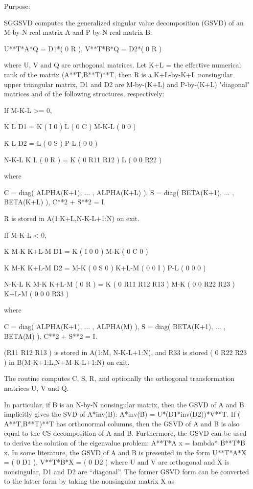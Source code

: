  \begin{DoxyParagraph}{Purpose\+: }
\begin{DoxyVerb} SGGSVD computes the generalized singular value decomposition (GSVD)
 of an M-by-N real matrix A and P-by-N real matrix B:

       U**T*A*Q = D1*( 0 R ),    V**T*B*Q = D2*( 0 R )

 where U, V and Q are orthogonal matrices.
 Let K+L = the effective numerical rank of the matrix (A**T,B**T)**T,
 then R is a K+L-by-K+L nonsingular upper triangular matrix, D1 and
 D2 are M-by-(K+L) and P-by-(K+L) "diagonal" matrices and of the
 following structures, respectively:

 If M-K-L >= 0,

                     K  L
        D1 =     K ( I  0 )
                 L ( 0  C )
             M-K-L ( 0  0 )

                   K  L
        D2 =   L ( 0  S )
             P-L ( 0  0 )

                 N-K-L  K    L
   ( 0 R ) = K (  0   R11  R12 )
             L (  0    0   R22 )

 where

   C = diag( ALPHA(K+1), ... , ALPHA(K+L) ),
   S = diag( BETA(K+1),  ... , BETA(K+L) ),
   C**2 + S**2 = I.

   R is stored in A(1:K+L,N-K-L+1:N) on exit.

 If M-K-L < 0,

                   K M-K K+L-M
        D1 =   K ( I  0    0   )
             M-K ( 0  C    0   )

                     K M-K K+L-M
        D2 =   M-K ( 0  S    0  )
             K+L-M ( 0  0    I  )
               P-L ( 0  0    0  )

                    N-K-L  K   M-K  K+L-M
   ( 0 R ) =     K ( 0    R11  R12  R13  )
               M-K ( 0     0   R22  R23  )
             K+L-M ( 0     0    0   R33  )

 where

   C = diag( ALPHA(K+1), ... , ALPHA(M) ),
   S = diag( BETA(K+1),  ... , BETA(M) ),
   C**2 + S**2 = I.

   (R11 R12 R13 ) is stored in A(1:M, N-K-L+1:N), and R33 is stored
   ( 0  R22 R23 )
   in B(M-K+1:L,N+M-K-L+1:N) on exit.

 The routine computes C, S, R, and optionally the orthogonal
 transformation matrices U, V and Q.

 In particular, if B is an N-by-N nonsingular matrix, then the GSVD of
 A and B implicitly gives the SVD of A*inv(B):
                      A*inv(B) = U*(D1*inv(D2))*V**T.
 If ( A**T,B**T)**T  has orthonormal columns, then the GSVD of A and B is
 also equal to the CS decomposition of A and B. Furthermore, the GSVD
 can be used to derive the solution of the eigenvalue problem:
                      A**T*A x = lambda* B**T*B x.
 In some literature, the GSVD of A and B is presented in the form
                  U**T*A*X = ( 0 D1 ),   V**T*B*X = ( 0 D2 )
 where U and V are orthogonal and X is nonsingular, D1 and D2 are
 ``diagonal''.  The former GSVD form can be converted to the latter
 form by taking the nonsingular matrix X as


\end{DoxyVerb}
\end{DoxyParagraph}

